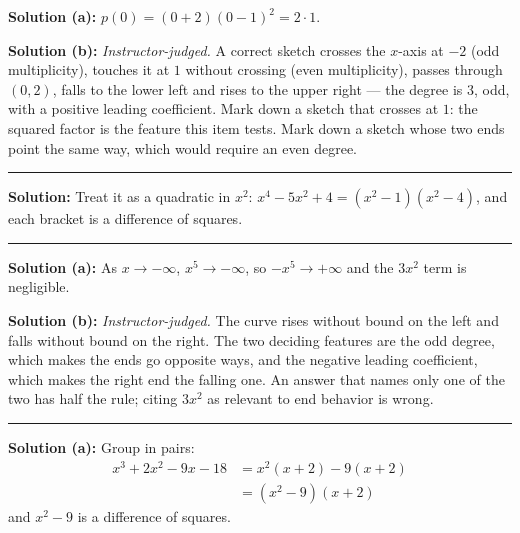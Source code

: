 \documentclass[12pt]{article}
\begin{document}

\textbf{Solution (a):} $p(0) = (0+2)(0-1)^{2} = 2 \cdot 1$. 

\textbf{Solution (b):} \emph{Instructor-judged.} A correct sketch crosses the $x$-axis at $-2$ (odd multiplicity), touches it at $1$ without crossing (even multiplicity), passes through $(0, 2)$, falls to the lower left and rises to the upper right --- the degree is $3$, odd, with a positive leading coefficient. Mark down a sketch that crosses at $1$: the squared factor is the feature this item tests. Mark down a sketch whose two ends point the same way, which would require an even degree.

\vspace{0.1cm}\noindent\rule{\linewidth}{0.2pt}


\textbf{Solution:} Treat it as a quadratic in $x^{2}$: $x^{4} - 5x^{2} + 4 = \left(x^{2} - 1\right)\left(x^{2} - 4\right)$, and each bracket is a difference of squares. 

\vspace{0.1cm}\noindent\rule{\linewidth}{0.2pt}


\textbf{Solution (a):} As $x \to -\infty$, $x^{5} \to -\infty$, so $-x^{5} \to +\infty$ and the $3x^{2}$ term is negligible. 

\textbf{Solution (b):} \emph{Instructor-judged.} The curve rises without bound on the left and falls without bound on the right. The two deciding features are the odd degree, which makes the ends go opposite ways, and the negative leading coefficient, which makes the right end the falling one. An answer that names only one of the two has half the rule; citing $3x^{2}$ as relevant to end behavior is wrong.

\vspace{0.1cm}\noindent\rule{\linewidth}{0.2pt}


\textbf{Solution (a):} Group in pairs:
\begin{align*}
  x^{3} + 2x^{2} - 9x - 18 &= x^{2}(x + 2) - 9(x + 2) \\
                           &= \left(x^{2} - 9\right)(x + 2)
\end{align*}
and $x^{2} - 9$ is a difference of squares. 
\end{document}
